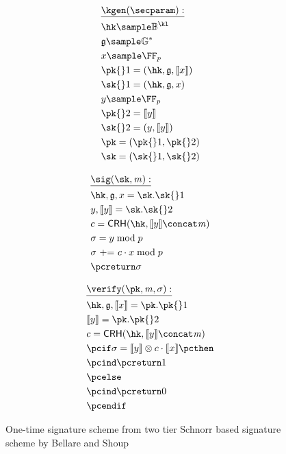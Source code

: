 \begin{figure*}[ht]
    \begin{minipage}[t]{0.33\textwidth}
        \begin{align*}
            & \underline{\kgen(\secparam):} \\
            & \hk \sample \BB^{\kl} \\
            & \ggen \sample \gset^* \\
            & x \sample \FFx{p} \\
            & \pk{}1 = (\hk, \ggen, \groupenc{x}) \\
            & \sk{}1 = (\hk, \ggen, x) \\
            & y \sample \FFx{p} \\
            & \pk{}2 =  \groupenc{y} \\
            & \sk{}2 = (y, \groupenc{y}) \\
            & \pk = (\pk{}1, \pk{}2) \\
            & \sk = (\sk{}1, \sk{}2) \\
        \end{align*}
    \end{minipage}%
    \begin{minipage}[t]{0.33\textwidth}
        \begin{align*}
            & \underline{\sig(\sk, \msg):}\\
            & \hk, \ggen, x = \sk.\sk{}1 \\
            & y, \groupenc{y} = \sk.\sk{}2 \\
            & c = \crh(\hk, \groupenc{y} \concat \msg) \\
            & \sigma = y \bmod p \\
            & \sigma\ \text{+=}\ c \cdot x \bmod p \\
            & \pcreturn \sigma
        \end{align*}
    \end{minipage}%
    \begin{minipage}[t]{0.33\textwidth}
        \begin{align*}
        & \underline{\verify(\pk, \msg, \sigma):}\\
        &  \hk, \ggen, \groupenc{x} = \pk.\pk{}1 \\
        &  \groupenc{y} = \pk.\pk{}2 \\
        &  c = \crh(\hk, \groupenc{y} \concat \msg)\\
        &  \pcif \sigma = \groupenc{y} \otimes c \cdot \groupenc{x} \pcthen \\
        &  \pcind \pcreturn 1\\
        &  \pcelse\\
        &  \pcind \pcreturn 0\\
        &  \pcendif
        \end{align*}
    \end{minipage}
\caption{One-time signature scheme from two tier Schnorr based signature scheme by Bellare and Shoup~\cite{bellare2007two}}\label{instantiation:fig:ots-from-two-tier-sig}
\end{figure*}

